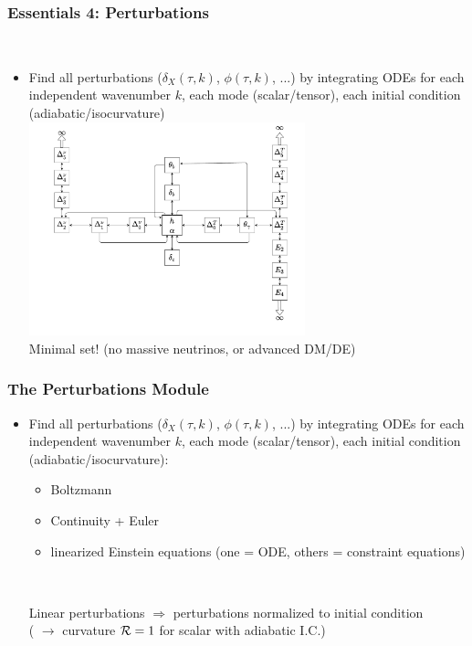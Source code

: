 \begin{frame}[fragile]
	\frametitle{Essentials 4: Perturbations}
	
	\mbox{}\\
	\begin{itemize}
		\item
		Find all perturbations ($\delta_X(\tau,k)$, $\phi(\tau,k)$, ...)  by integrating ODEs for each independent wavenumber $k$, each mode (scalar/tensor), each initial condition (adiabatic/isocurvature)\\
		{\centering\includegraphics[width=8cm]{Figures/BoltzmannDiagram.pdf}\\}
		\vspace*{-5\baselineskip}\hspace*{-1em}
		{\Red Minimal set!} (no massive neutrinos, or advanced DM/DE)
	\end{itemize}
\end{frame}


\begin{frame}[fragile]
	\frametitle{The Perturbations Module}
	
	\begin{itemize}
		\item
		Find all perturbations ($\delta_X(\tau,k)$, $\phi(\tau,k)$, ...)  by integrating ODEs for each independent wavenumber $k$, each mode (scalar/tensor), each initial condition (adiabatic/isocurvature):
		\begin{itemize}
			\item \scriptsize Boltzmann
			\item  \scriptsize Continuity + Euler
			\item \scriptsize linearized Einstein equations (one = ODE, others = constraint equations)
			
			\mbox{}\\
			
		\end{itemize}
		Linear perturbations $\Rightarrow$ perturbations normalized to initial condition \\
		({\Red \CLASS{}} $\rightarrow$ curvature ${\cal R}=1$ for scalar with adiabatic I.C.)
	\end{itemize}
\end{frame}

